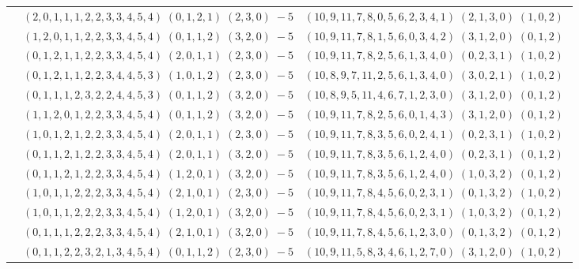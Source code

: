 \documentclass[11pt]{article}
\begin{document}
\begin{longtable}[l]{|c|c|c|}
 \cline{2-3} 
 & $(2 ,0 ,1 ,1 ,1 ,2 ,2 ,3 ,3 ,4 ,5 ,4) \;(0 ,1 ,2 ,1) \;(2 ,3 ,0) \;-5$ & $(10 ,9 ,11 ,7 ,8 ,0 ,5 ,6 ,2 ,3 ,4 ,1) \;(2 ,1 ,3 ,0) \;(1 ,0 ,2) \;$\\ 
 \cline{2-3} 
 & $(1 ,2 ,0 ,1 ,1 ,2 ,2 ,3 ,3 ,4 ,5 ,4) \;(0 ,1 ,1 ,2) \;(3 ,2 ,0) \;-5$ & $(10 ,9 ,11 ,7 ,8 ,1 ,5 ,6 ,0 ,3 ,4 ,2) \;(3 ,1 ,2 ,0) \;(0 ,1 ,2) \;$\\ 
 \cline{2-3} 
 & $(0 ,1 ,2 ,1 ,1 ,2 ,2 ,3 ,3 ,4 ,5 ,4) \;(2 ,0 ,1 ,1) \;(2 ,3 ,0) \;-5$ & $(10 ,9 ,11 ,7 ,8 ,2 ,5 ,6 ,1 ,3 ,4 ,0) \;(0 ,2 ,3 ,1) \;(1 ,0 ,2) \;$\\ 
 \cline{2-3} 
 & $(0 ,1 ,2 ,1 ,1 ,2 ,2 ,3 ,4 ,4 ,5 ,3) \;(1 ,0 ,1 ,2) \;(2 ,3 ,0) \;-5$ & $(10 ,8 ,9 ,7 ,11 ,2 ,5 ,6 ,1 ,3 ,4 ,0) \;(3 ,0 ,2 ,1) \;(1 ,0 ,2) \;$\\ 
 \cline{2-3} 
 & $(0 ,1 ,1 ,1 ,2 ,3 ,2 ,2 ,4 ,4 ,5 ,3) \;(0 ,1 ,1 ,2) \;(3 ,2 ,0) \;-5$ & $(10 ,8 ,9 ,5 ,11 ,4 ,6 ,7 ,1 ,2 ,3 ,0) \;(3 ,1 ,2 ,0) \;(0 ,1 ,2) \;$\\ 
 \cline{2-3} 
 & $(1 ,1 ,2 ,0 ,1 ,2 ,2 ,3 ,3 ,4 ,5 ,4) \;(0 ,1 ,1 ,2) \;(3 ,2 ,0) \;-5$ & $(10 ,9 ,11 ,7 ,8 ,2 ,5 ,6 ,0 ,1 ,4 ,3) \;(3 ,1 ,2 ,0) \;(0 ,1 ,2) \;$\\ 
 \cline{2-3} 
 & $(1 ,0 ,1 ,2 ,1 ,2 ,2 ,3 ,3 ,4 ,5 ,4) \;(2 ,0 ,1 ,1) \;(2 ,3 ,0) \;-5$ & $(10 ,9 ,11 ,7 ,8 ,3 ,5 ,6 ,0 ,2 ,4 ,1) \;(0 ,2 ,3 ,1) \;(1 ,0 ,2) \;$\\ 
 \cline{2-3} 
 & $(0 ,1 ,1 ,2 ,1 ,2 ,2 ,3 ,3 ,4 ,5 ,4) \;(2 ,0 ,1 ,1) \;(3 ,2 ,0) \;-5$ & $(10 ,9 ,11 ,7 ,8 ,3 ,5 ,6 ,1 ,2 ,4 ,0) \;(0 ,2 ,3 ,1) \;(0 ,1 ,2) \;$\\ 
 \cline{2-3} 
 & $(0 ,1 ,1 ,2 ,1 ,2 ,2 ,3 ,3 ,4 ,5 ,4) \;(1 ,2 ,0 ,1) \;(3 ,2 ,0) \;-5$ & $(10 ,9 ,11 ,7 ,8 ,3 ,5 ,6 ,1 ,2 ,4 ,0) \;(1 ,0 ,3 ,2) \;(0 ,1 ,2) \;$\\ 
 \cline{2-3} 
 & $(1 ,0 ,1 ,1 ,2 ,2 ,2 ,3 ,3 ,4 ,5 ,4) \;(2 ,1 ,0 ,1) \;(2 ,3 ,0) \;-5$ & $(10 ,9 ,11 ,7 ,8 ,4 ,5 ,6 ,0 ,2 ,3 ,1) \;(0 ,1 ,3 ,2) \;(1 ,0 ,2) \;$\\ 
 \cline{2-3} 
 & $(1 ,0 ,1 ,1 ,2 ,2 ,2 ,3 ,3 ,4 ,5 ,4) \;(1 ,2 ,0 ,1) \;(3 ,2 ,0) \;-5$ & $(10 ,9 ,11 ,7 ,8 ,4 ,5 ,6 ,0 ,2 ,3 ,1) \;(1 ,0 ,3 ,2) \;(0 ,1 ,2) \;$\\ 
 \cline{2-3} 
 & $(0 ,1 ,1 ,1 ,2 ,2 ,2 ,3 ,3 ,4 ,5 ,4) \;(2 ,1 ,0 ,1) \;(3 ,2 ,0) \;-5$ & $(10 ,9 ,11 ,7 ,8 ,4 ,5 ,6 ,1 ,2 ,3 ,0) \;(0 ,1 ,3 ,2) \;(0 ,1 ,2) \;$\\ 
 \cline{2-3} 
 & $(0 ,1 ,1 ,2 ,2 ,3 ,2 ,1 ,3 ,4 ,5 ,4) \;(0 ,1 ,1 ,2) \;(2 ,3 ,0) \;-5$ & $(10 ,9 ,11 ,5 ,8 ,3 ,4 ,6 ,1 ,2 ,7 ,0) \;(3 ,1 ,2 ,0) \;(1 ,0 ,2) \;$\\ 

\end{longtable}
\end{document}
